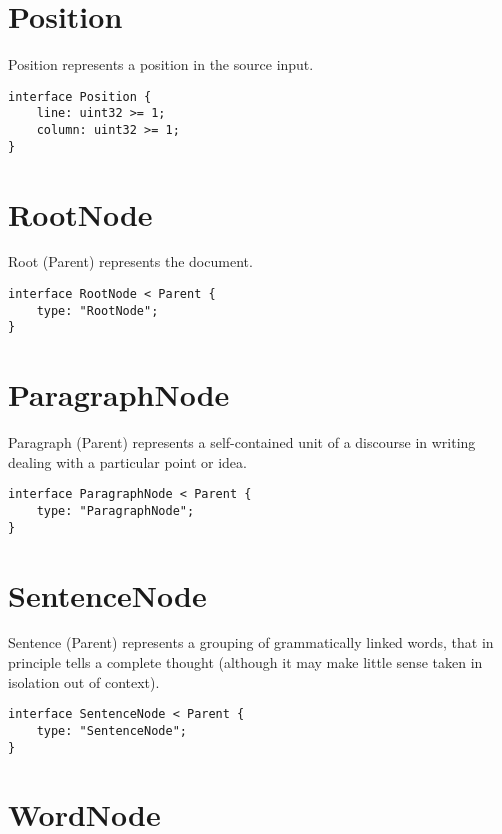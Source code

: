 \section*{Position}\label{position}

Position represents a position in the source input.

\begin{lstlisting}
interface Position {
    line: uint32 >= 1;
    column: uint32 >= 1;
}
\end{lstlisting}

\section*{RootNode}\label{rootnode}

Root (Parent) represents the document.

\begin{lstlisting}
interface RootNode < Parent {
    type: "RootNode";
}
\end{lstlisting}

\section*{ParagraphNode}\label{paragraphnode}

Paragraph (Parent) represents a self-contained unit of a discourse in
writing dealing with a particular point or idea.

\begin{lstlisting}
interface ParagraphNode < Parent {
    type: "ParagraphNode";
}
\end{lstlisting}

\section*{SentenceNode}\label{sentencenode}

Sentence (Parent) represents a grouping of grammatically linked words,
that in principle tells a complete thought (although it may make little
sense taken in isolation out of context).

\begin{lstlisting}
interface SentenceNode < Parent {
    type: "SentenceNode";
}
\end{lstlisting}

\section*{WordNode}\label{wordnode}

